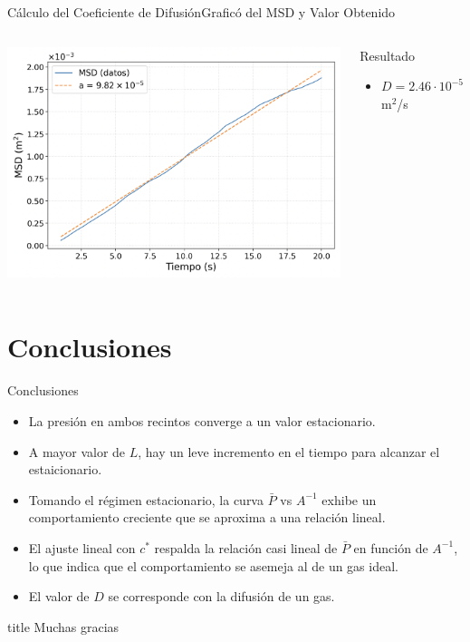 \documentclass{beamer}
\begin{document}
\begin{frame}{Cálculo del Coeficiente de Difusión}{Graficó del MSD y Valor Obtenido}
    \begin{columns}[c]
            \centering
            \includegraphics[height=.55\textheight]{resources/difusion.png}
            \begin{minipage}[t]{\linewidth}
                \begin{block}{Resultado}
                    \begin{itemize}
                        \item $D=2.46\cdot10^{-5}$m$^2$/s
                    \end{itemize}
                \end{block}
            \end{minipage}
    \end{columns}
\end{frame}

\section{Conclusiones}
\begin{frame}{Conclusiones}
    \begin{itemize}
        \item La presión en ambos recintos converge a un valor estacionario.
        \item A mayor valor de $L$, hay un leve incremento en el tiempo para alcanzar el estaicionario.
        \item Tomando el régimen estacionario, la curva $\bar{P}$ vs $A^{-1}$ exhibe un comportamiento creciente que se aproxima a una relación lineal.
        \item El ajuste lineal con $c^*$ respalda la relación casi lineal de $\bar{P}$ en función de $A^{-1}$, lo que indica que el comportamiento se asemeja al de un gas ideal.
        \item El valor de $D$ se corresponde con la difusión de un gas.
    \end{itemize}
\end{frame}


\begin{frame}
    \begin{beamercolorbox}[sep=8pt,center]{title}
         Muchas gracias
    \end{beamercolorbox}
\end{frame}
\end{document}
